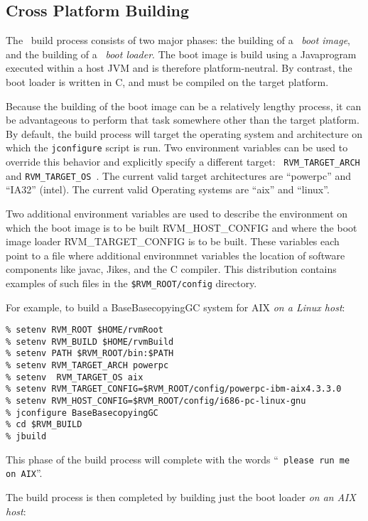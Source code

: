 \subsection{Cross Platform Building}

The \jp\ build process consists of two major phases: the building of a
\jp\ {\em boot image}, and the building of a \jp\ {\em boot loader}.
The boot image is build using a Java\trademark program executed within a host
JVM and is therefore platform-neutral.  By contrast, the boot loader
is written in C, and must be compiled on the target platform.

Because the building of the boot image can be a relatively lengthy
process, it can be advantageous to perform that task somewhere other
than the target platform.  By default, the build process will target
the operating system and architecture on which the {\tt jconfigure}
script is run.  
    Two environment variables can be used to
override this behavior and explicitly specify a different target: {\tt
  RVM\_TARGET\_ARCH } and {\tt RVM\_TARGET\_OS }. The current valid target
architectures are ``powerpc'' and ``IA32'' (intel). The current valid
Operating systems are ``aix'' and ``linux''.

    Two additional environment variables are used to describe the 
environment on which the boot image is to be built RVM\_HOST\_CONFIG  and where
the boot image loader  RVM\_TARGET\_CONFIG is to be built. These variables
each point to a file where additional environmnet variables the location
of software components like javac, Jikes\trademark, and the C compiler. This distribution
contains examples of such files in the {\tt \$RVM\_ROOT/config} directory.   

For example, to build a BaseBasecopyingGC system for AIX {\em on a Linux
host}:
\begin{verbatim}
% setenv RVM_ROOT $HOME/rvmRoot
% setenv RVM_BUILD $HOME/rvmBuild
% setenv PATH $RVM_ROOT/bin:$PATH
% setenv RVM_TARGET_ARCH powerpc
% setenv  RVM_TARGET_OS aix
% setenv RVM_TARGET_CONFIG=$RVM_ROOT/config/powerpc-ibm-aix4.3.3.0
% setenv RVM_HOST_CONFIG=$RVM_ROOT/config/i686-pc-linux-gnu
% jconfigure BaseBasecopyingGC
% cd $RVM_BUILD
% jbuild
\end{verbatim}

This phase of the build process will complete with the words ``{\tt
  please run me on AIX}''.


The build process is then completed by building just the boot loader {\em
  on an AIX host}:

